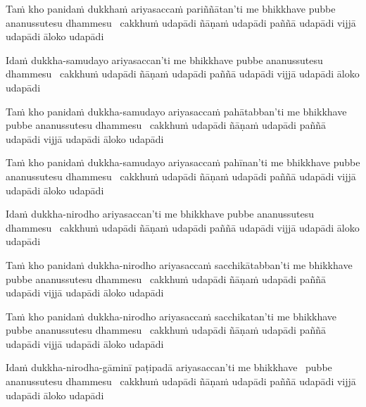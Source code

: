 \begin{pali-hang}
  Taṁ kho panidaṁ dukkhaṁ ariyasaccaṁ pariññātan'ti me bhikkhave  pubbe ananussutesu dhammesu \breathmark\ cakkhuṁ udapādi ñāṇaṁ udapādi paññā udapādi vijjā udapādi āloko udapādi
\end{pali-hang}

\begin{pali-hang}
  Idaṁ dukkha-samudayo ariyasaccan'ti me bhikkhave  pubbe ananussutesu dhammesu \breathmark\ cakkhuṁ udapādi ñāṇaṁ udapādi paññā udapādi vijjā udapādi āloko udapādi
\end{pali-hang}

\begin{pali-hang}
  Taṁ kho panidaṁ dukkha-samudayo ariyasaccaṁ pahātabban'ti me bhikkhave  pubbe ananussutesu dhammesu \breathmark\ cakkhuṁ udapādi ñāṇaṁ udapādi paññā udapādi vijjā udapādi āloko udapādi
\end{pali-hang}

\begin{pali-hang}
  Taṁ kho panidaṁ dukkha-samudayo ariyasaccaṁ pahīnan'ti me bhikkhave  pubbe ananussutesu dhammesu \breathmark\ cakkhuṁ udapādi ñāṇaṁ udapādi paññā udapādi vijjā udapādi āloko udapādi
\end{pali-hang}

\begin{pali-hang}
  Idaṁ dukkha-nirodho ariyasaccan'ti me bhikkhave  pubbe ananussutesu dhammesu \breathmark\ cakkhuṁ udapādi ñāṇaṁ udapādi paññā udapādi vijjā udapādi āloko udapādi
\end{pali-hang}

\begin{pali-hang}
  Taṁ kho panidaṁ dukkha-nirodho ariyasaccaṁ sacchikātabban'ti me bhikkhave  pubbe ananussutesu dhammesu \breathmark\ cakkhuṁ udapādi ñāṇaṁ udapādi paññā udapādi vijjā udapādi āloko udapādi
\end{pali-hang}

\begin{pali-hang}
  Taṁ kho panidaṁ dukkha-nirodho ariyasaccaṁ sacchikatan'ti me bhikkhave pubbe ananussutesu dhammesu \breathmark\ cakkhuṁ udapādi ñāṇaṁ udapādi paññā udapādi vijjā udapādi āloko udapādi
\end{pali-hang}

\begin{pali-hang}
  Idaṁ dukkha-nirodha-gāminī paṭipadā ariyasaccan'ti me \mbox{bhikkhave}~ pubbe ananussutesu dhammesu \breathmark\ cakkhuṁ udapādi ñāṇaṁ udapādi paññā udapādi vijjā udapādi āloko udapādi
\end{pali-hang}

